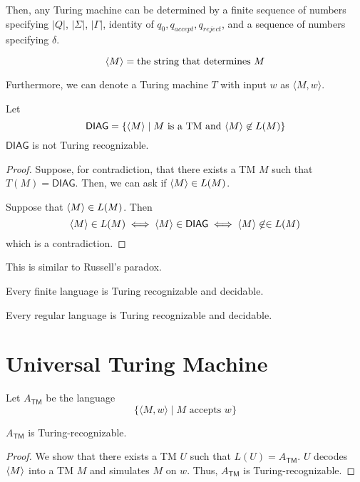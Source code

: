 Then, any Turing machine can be determined by a finite sequence of numbers specifying $|Q|$, $|\Sigma|$, $|\Gamma|$, identity of $q_0,q_{accept},q_{reject}$, and a sequence of numbers specifying $\delta$.

$$
\langle M \rangle = \text{the string that determines $M$}
$$

Furthermore, we can denote a Turing machine $T$ with input $w$ as $\langle M, w \rangle$.

\begin{theorem}
    Let
    $$
    \mathsf{DIAG} = \{ \langle M \rangle \mid \text{$M$ is a TM and $\langle M \rangle \not\in L(M)$} \}
    $$
    $\mathsf{DIAG}$ is not Turing recognizable.
\end{theorem}

\begin{proof}
    Suppose, for contradiction, that there exists a TM $M$ such that $T(M) = \mathsf{DIAG}$. Then, we can ask if $\langle M \rangle \in L(M)$.

    Suppose that $\langle M \rangle \in L(M)$. Then
    $$
    \langle M \rangle \in L(M) \iff \langle M \rangle \in \mathsf{DIAG} \iff \langle M \rangle \not\in \in L(M)
    $$
    which is a contradiction.
\end{proof}

This is similar to Russell's paradox.

\begin{theorem}
    Every finite language is Turing recognizable and decidable.
\end{theorem}

\begin{theorem}
    Every regular language is Turing recognizable and decidable.
\end{theorem}

\section{Universal Turing Machine}

Let $A_{\mathsf{TM}}$ be the language
$$
\{ \langle M,w \rangle \mid \text{$M$ accepts $w$} \}
$$

\begin{theorem}
    $A_{\mathsf{TM}}$ is Turing-recognizable.
\end{theorem}

\begin{proof}
    We show that there exists a TM $U$ such that $L(U) = A_{\mathsf{TM}}$. $U$ decodes $\langle M \rangle$ into a TM $M$ and simulates $M$ on $w$. Thus, $A_{\mathsf{TM}}$ is Turing-recognizable.
\end{proof}

